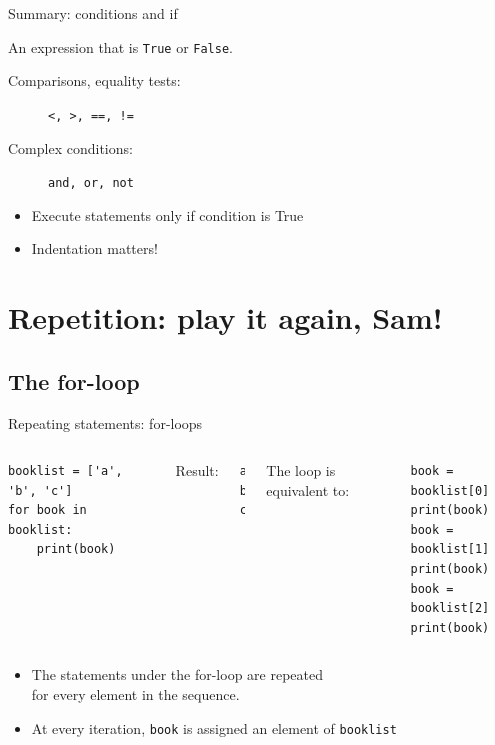 \documentclass[aspectratio=169,usenames,dvipsnames]{beamer}
\begin{document}
\begin{frame}{Summary: conditions and if}
    \begin{description}[if-statements]
        \item[Conditions] An expression that is \lstinline{True} or \lstinline{False}.
            \begin{description}
                \item[Comparisons, equality tests:] \lstinline{<, >, ==, !=}
                \item[Complex conditions:]          \lstinline{and, or, not}
            \end{description}
        \item[if-statements]
            \begin{itemize}
                \item Execute statements only if condition is True
                \item Indentation matters!
            \end{itemize}
    \end{description}
\end{frame}


\section{Repetition: play it again, Sam!}
\subsection{The for-loop}
\frame{\tableofcontents[currentsection]}

\begin{frame}[fragile]{Repeating statements: for-loops}
\begin{columns}
\begin{lstlisting}
booklist = ['a', 'b', 'c']
for book in booklist:
    print(book)
\end{lstlisting}
Result:
\begin{lstlisting}
a
b
c
\end{lstlisting}

    \pause
The loop is equivalent to:
\begin{lstlisting}
book = booklist[0]
print(book)
book = booklist[1]
print(book)
book = booklist[2]
print(book)
\end{lstlisting}
\end{columns}

\begin{itemize}
\item The statements under the for-loop are repeated \\
    for every element in the sequence.
\item At every iteration, \lstinline{book} is assigned
    an element of \lstinline{booklist}
\end{itemize}
\end{frame}
\end{document}
